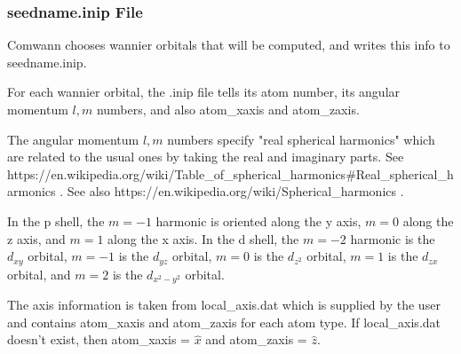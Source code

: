 \documentclass[aps,prb,singlecolumn,preprintnumbers,amsmath,amssymb]{revtex4}
\begin{document}
\subsubsection{seedname.inip File}
Comwann chooses wannier orbitals that will be computed, and writes this info to seedname.inip.

For each wannier orbital, the .inip file tells its atom number, its angular momentum $l,m$ numbers, and also atom\_xaxis and atom\_zaxis.  

The angular momentum $l,m$ numbers specify "real spherical harmonics" which are related to the usual ones by taking the real and imaginary parts.    See https://en.wikipedia.org/wiki/Table\_of\_spherical\_harmonics\#Real\_spherical\_harmonics . See also https://en.wikipedia.org/wiki/Spherical\_harmonics .   

In the p shell, the $m=-1$ harmonic is oriented along the y axis, $m=0$ along the z axis, and $m=1$ along the x axis.  In the d shell, the $m=-2$ harmonic is the $d_{xy}$ orbital, $m=-1$ is the $d_{yz}$ orbital, $m=0$ is the $d_{z^2}$ orbital, $m=1$ is the $d_{zx}$ orbital, and $m=2$ is the $d_{x^2 -y^2}$ orbital.

The axis information is taken from local\_axis.dat which is supplied by the user and contains atom\_xaxis and atom\_zaxis for each atom type. If local\_axis.dat doesn't exist, then atom\_xaxis = $\hat{x}$ and atom\_zaxis = $\hat{z}$.
\end{document}
